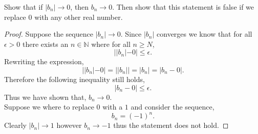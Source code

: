 \documentclass[12pt]{article}
\makeatletter
\theoremstyle{homework}
\newenvironment{exercise}[1]
{\def\@currentlabel{#1}\exercisecore}
{\endexercisecore}
\newcommand{\Nats}{\ensuremath{\mathbb N}}
\makeatother
\begin{document}
\begin{exercise}{Supplemental 3}
Show that if $|b_n|\to 0$, then $b_n\to 0$.
Then show that this statement is false if we replace $0$
with any other real number.\\

\begin{proof}
  Suppose the sequence $|b_n|\to 0$. Since $|b_n|$ converges we know that for all $\epsilon > 0$ there exists an $n \in \Nats$
  where for all $n \geq N$,
  \begin{equation*}
    ||b_n| - 0| \le \epsilon.
  \end{equation*}
  Rewriting the expression,
  \begin{equation*}
    ||b_n| - 0| = ||b_n|| = |b_n| = |b_n - 0|.
  \end{equation*}
  Therefore the following inequality still holds,
  \begin{equation*}
    |b_n - 0| \le \epsilon.
  \end{equation*}
Thus we have shown that, $b_n\to 0$.\\

Suppose we where to replace $0$ with a $1$ and consider the sequence,
\begin{equation*}
  b_n = (-1)^n.
\end{equation*}
Clearly $|b_n|\to 1$ however $b_n\to -1$ thus the statement does not hold.
\end{proof}
\end{exercise}
\vspace{.5in}
\end{document}
